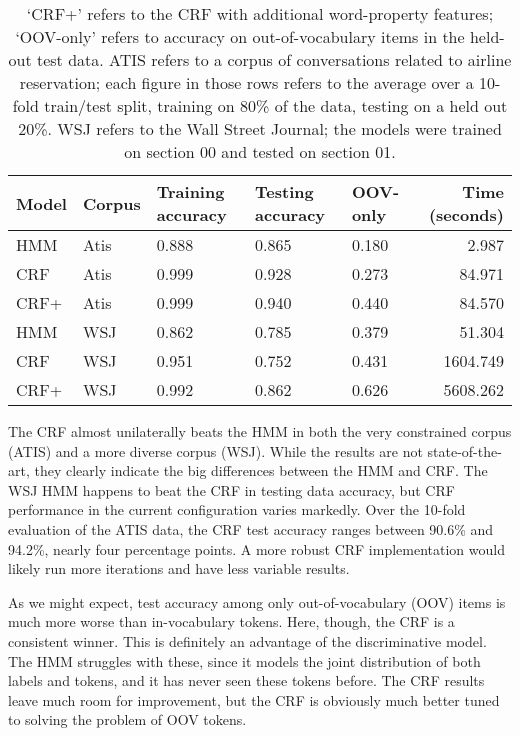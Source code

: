\documentclass[10pt]{article}\usepackage{graphicx, color}
\begin{document}
\begin{table}[H]
  \centering
  \begin{tabular}{lllllr}
    Model & Corpus & Training accuracy & Testing accuracy & OOV-only & Time (seconds) \\
    \midrule
    HMM   & Atis & 0.888 & 0.865 &
      0.180 & 2.987 \\
    CRF   & Atis & 0.999 & 0.928 &
      0.273 & 84.971 \\
    CRF+ & Atis & 0.999 & 0.940 &
      0.440 & 84.570 \\
    \midrule
    HMM   & WSJ & 0.862 & 0.785 &
      0.379 & 51.304 \\
    CRF   & WSJ & 0.951 & 0.752 &
      0.431 & 1604.749 \\
    CRF+ & WSJ & 0.992 & 0.862 &
      0.626 & 5608.262 \\
  \end{tabular}
  \caption{`CRF+' refers to the CRF with additional word-property features; `OOV-only' refers to accuracy on out-of-vocabulary items in the held-out test data. ATIS refers to a corpus of conversations related to airline reservation; each figure in those rows refers to the average over a 10-fold train/test split, training on 80\% of the data, testing on a held out 20\%. WSJ refers to the Wall Street Journal; the models were trained on section 00 and tested on section 01.}
  \label{table:1}
\end{table}

The CRF almost unilaterally beats the HMM in both the very constrained corpus (ATIS) and a more diverse corpus (WSJ). While the results are not state-of-the-art, they clearly indicate the big differences between the HMM and CRF.
The WSJ HMM happens to beat the CRF in testing data accuracy, but CRF performance in the current configuration varies markedly. Over the 10-fold evaluation of the ATIS data, the CRF test accuracy ranges between 90.6\% and 94.2\%, nearly four percentage points.
A more robust CRF implementation would likely run more iterations and have less variable results.

As we might expect, test accuracy among only out-of-vocabulary (OOV) items is much more worse than in-vocabulary tokens. Here, though, the CRF is a consistent winner. This is definitely an advantage of the discriminative model. The HMM struggles with these, since it models the joint distribution of both labels and tokens, and it has never seen these tokens before. The CRF results leave much room for improvement, but the CRF is obviously much better tuned to solving the problem of OOV tokens.
\end{document}
